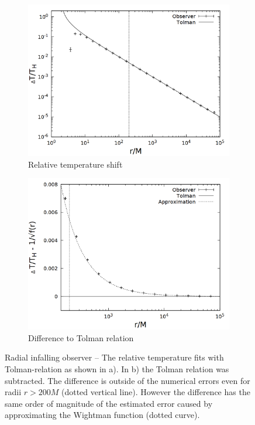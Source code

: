 \begin{figure}[h]
  \centering
  \begin{subfigure}[h]{0.5\textwidth}
    \centering
    \includegraphics[width=\textwidth]{cpp/final/rad.png}
    \caption{Relative temperature shift}
  \end{subfigure}%
  \begin{subfigure}[h]{0.5\textwidth}
    \centering
    \includegraphics[width=\textwidth]{cpp/final/rad_tolman_error.png}
    \caption{Difference to Tolman relation}
  \end{subfigure}
  \caption{Radial infalling observer -- The relative temperature fits with Tolman-relation as shown in a). In b) the Tolman relation was subtracted. The difference is outside of the numerical errors even for radii \(r > 200 M\) (dotted vertical line). However the difference has the same order of magnitude of the estimated error caused by approximating the Wightman function (dotted curve).}
  \label{fig:bh_rad}
\end{figure}

